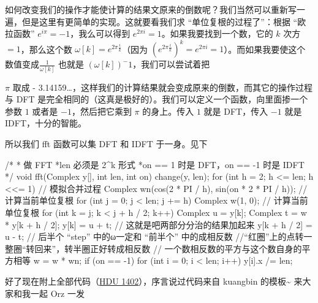 如何改变我们的操作才能使计算的结果文原来的倒数呢？我们当然可以重新写一遍，但是这里有更简单的实现。这就要看我们求 “单位复根的过程了”：根据 “欧拉函数” $e^{i\pi}=-1$，我么可以得到 $e^{2\pi i}=1$。如果我要找到一个数，它的 $k$ 次方 $= 1$，那么这个数 $\omega[k]=e^{2\pi \frac{i}{k}}$（因为 $(e^{2\pi \frac{i}{k}})^k=e^{2\pi i}=1$）。而如果我要使这个数值变成$\frac{1}{\omega[k]}$ 也就是 $(\omega[k])^-1$，我们可以尝试着把

$π$ 取成 - 3.14159…，这样我们的计算结果就会变成原来的倒数，而其它的操作过程与 DFT 是完全相同的（这真是极好的）。我们可以定义一个函数，向里面掺一个参数 $1$ 或者是 $-1$，然后把它乘到 $π$ 的身上。传入 $1$ 就是 DFT，传入 $-1$ 就是 IDFT，十分的智能。

所以我们 fft 函数可以集 DFT 和 IDFT 于一身。见下

\begin{cppcode}
/*
 * 做 FFT
 *len 必须是 2^k 形式
 *on == 1 时是 DFT，on == -1 时是 IDFT
 */
void fft(Complex y[], int len, int on) {
  change(y, len);
  for (int h = 2; h <= len; h <<= 1) {                  // 模拟合并过程
    Complex wn(cos(2 * PI / h), sin(on * 2 * PI / h));  // 计算当前单位复根
    for (int j = 0; j < len; j += h) {
      Complex w(1, 0);  // 计算当前单位复根
      for (int k = j; k < j + h / 2; k++) {
        Complex u = y[k];
        Complex t = w * y[k + h / 2];
        y[k] = u + t;  // 这就是吧两部分分治的结果加起来
        y[k + h / 2] = u - t;
        // 后半个 “step” 中的ω一定和 “前半个” 中的成相反数
        //“红圈”上的点转一整圈“转回来”，转半圈正好转成相反数
        // 一个数相反数的平方与这个数自身的平方相等
        w = w * wn;
      }
    }
  }
  if (on == -1) {
    for (int i = 0; i < len; i++) {
      y[i].x /= len;
    }
  }
}
\end{cppcode}

好了现在附上全部代码（\href{http://acm.hdu.edu.cn/showproblem.php?pid=1402}{HDU 1402}），序言说过代码来自 kuangbin 的模板\sout{}\textasciitilde{} 来大家和我一起 Orz 一发

